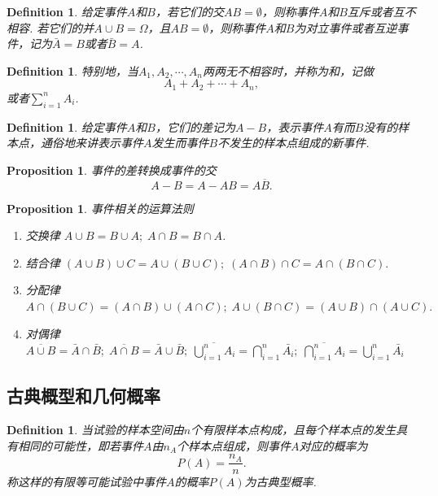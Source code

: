 \documentclass{article}
\newtheorem{proposition}[theorem]{Proposition}
\newtheorem{definition}[theorem]{Definition}
\begin{document}
\begin{definition}
\rm 给定事件$A$和$B$，若它们的交$AB = \emptyset$，则称事件$A$和$B${\color{red}互斥}或者{\color{red}互不相容}. 若它们的并$A\cup B = \Omega$，且$AB=\emptyset$，则称事件$A$和$B$为{\color{red}对立事件}或者{\color{red}互逆事件}，记为$\bar{A} = B$或者$\bar{B} = A$.
\end{definition}

\begin{definition}
\rm 特别地，当$A_1,A_2,\cdots,A_n$两两无不相容时，并称为和，记做
$$
A_1 + A_2 + \cdots + A_n,
$$
或者$\sum\limits_{i=1}^n A_i$. 
\end{definition}

\begin{definition}
\rm 给定事件$A$和$B$，它们的差记为$A-B$，表示事件$A$有而$B$没有的样本点，通俗地来讲表示{\color{red}事件$A$发生而事件$B$不发生}的样本点组成的新事件.
\end{definition}

\begin{proposition}
\rm 事件的差转换成事件的交
$$
A-B = A-AB = A\overline{B}. 
$$
\end{proposition}

\begin{proposition}
\rm {\color{red}事件相关的运算法则}
\begin{enumerate}
	\item 交换律 $A \cup B = B \cup A;\;A \cap B = B \cap A$.
	\item 结合律 $(A \cup B) \cup C = A \cup (B \cup C);\; (A \cap B) \cap C = A \cap (B \cap C).$
	\item 分配律 $A \cap (B \cup C) = (A \cap B) \cup (A \cap C);\; A \cup (B \cap C) = (A \cup B) \cap (A \cup C).$
	\item 对偶律 $\overline{A \cup B} = \bar{A} \cap \bar{B};\; \overline{A \cap B} = \bar{A} \cup \bar{B};\; \overline{\bigcup\limits_{i=1}^n A_i} = \bigcap\limits_{i=1}^n \bar{A_i};\; \overline{\bigcap\limits_{i=1}^n A_i} = \bigcup\limits_{i=1}^n \bar{A_i}$ 
\end{enumerate}
\end{proposition}

\subsection{古典概型和几何概率}

\begin{definition}
\rm 当试验的样本空间由$n$个{\color{red}有限}样本点构成，且{\color{red}每个样本点的发生具有相同的可能性}，即若事件$A$由$n_A$个样本点组成，则事件$A$对应的概率为
$$
P(A) = \frac{n_A}{n}.
$$
称这样的有限等可能试验中事件$A$的概率$P(A)$为{\color{red}古典型概率}.
\end{definition}
\end{document}
